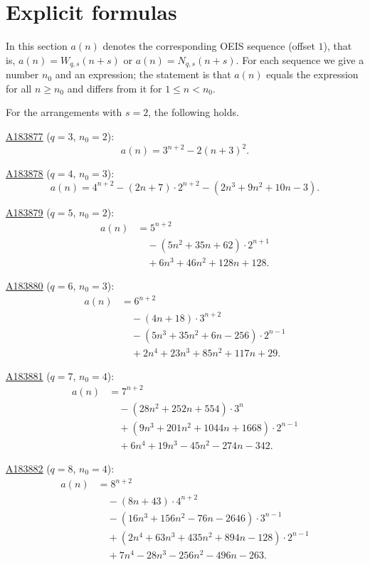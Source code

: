 \documentclass[12pt,reqno]{article}
\newcommand{\seqnum}[1]{\href{https://oeis.org/#1}{\rm \underline{#1}}}
\begin{document}
\section{Explicit formulas}\label{sec:formulas}

In this section $a(n)$ denotes the corresponding OEIS sequence (offset $1$),
that is, $a(n) = W_{q,s}(n+s)$ or $a(n) = N_{q,s}(n+s)$. For each sequence
we give a number $n_0$ and an expression; the statement is that $a(n)$ equals
the expression for all $n \ge n_0$ and differs from it for $1 \le n < n_0$.

\begin{theorem}\label{thm:explicit}
For the arrangements with $s = 2$, the following holds.

\noindent\seqnum{A183877} ($q=3$, $n_0 = 2$):
\[ a(n) = 3^{n+2} - 2(n+3)^{2}. \]

\noindent\seqnum{A183878} ($q=4$, $n_0 = 3$):
\[ a(n) = 4^{n+2} - (2n+7)\cdot 2^{n+2} - (2n^{3}+9n^{2}+10n-3). \]

\noindent\seqnum{A183879} ($q=5$, $n_0 = 2$):
\begin{align*}
a(n) &= 5^{n+2} \\
&\quad - (5n^{2}+35n+62)\cdot 2^{n+1} \\
&\quad + 6n^{3}+46n^{2}+128n+128.
\end{align*}

\noindent\seqnum{A183880} ($q=6$, $n_0 = 3$):
\begin{align*}
a(n) &= 6^{n+2} \\
&\quad - (4n+18)\cdot 3^{n+2} \\
&\quad - (5n^{3}+35n^{2}+6n-256)\cdot 2^{n-1} \\
&\quad + 2n^{4}+23n^{3}+85n^{2}+117n+29.
\end{align*}

\noindent\seqnum{A183881} ($q=7$, $n_0 = 4$):
\begin{align*}
a(n) &= 7^{n+2} \\
&\quad - (28n^{2}+252n+554)\cdot 3^n \\
&\quad + (9n^{3}+201n^{2}+1044n+1668)\cdot 2^{n-1} \\
&\quad + 6n^{4}+19n^{3}-45n^{2}-274n-342.
\end{align*}

\noindent\seqnum{A183882} ($q=8$, $n_0 = 4$):
\begin{align*}
a(n) &= 8^{n+2} \\
&\quad - (8n+43)\cdot 4^{n+2} \\
&\quad - (16n^{3}+156n^{2}-76n-2646)\cdot 3^{n-1} \\
&\quad + (2n^{4}+63n^{3}+435n^{2}+894n-128)\cdot 2^{n-1} \\
&\quad + 7n^{4}-28n^{3}-256n^{2}-496n-263.
\end{align*}


\end{theorem}
\end{document}
